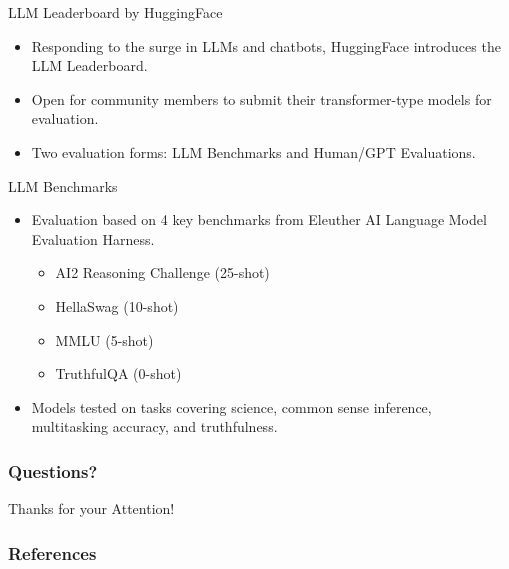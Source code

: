 \documentclass[handout]{beamer}
\begin{document}
\begin{frame}{LLM Leaderboard by HuggingFace}
  \begin{itemize}
    \item Responding to the surge in LLMs and chatbots, HuggingFace introduces the LLM Leaderboard.
    \item Open for community members to submit their transformer-type models for evaluation.
    \item Two evaluation forms: LLM Benchmarks and Human/GPT Evaluations.
  \end{itemize}
\end{frame}

\begin{frame}{LLM Benchmarks}
  \begin{itemize}
    \item Evaluation based on 4 key benchmarks from Eleuther AI Language Model Evaluation Harness.
      \begin{scriptsize}
      \begin{itemize}
        \item AI2 Reasoning Challenge (25-shot)
        \item HellaSwag (10-shot)
        \item MMLU (5-shot)
        \item TruthfulQA (0-shot)
      \end{itemize}
      \end{scriptsize}
    \item Models tested on tasks covering science, common sense inference, multitasking accuracy, and truthfulness.
  \end{itemize}
\end{frame}




\begin{frame}
\frametitle{Questions?}
\begin{center}\LARGE Thanks for your Attention!\\ \end{center}



\end{frame}

\begin{frame}[allowframebreaks]\scriptsize
\frametitle{References}


%
\end{frame}  


\end{document}
